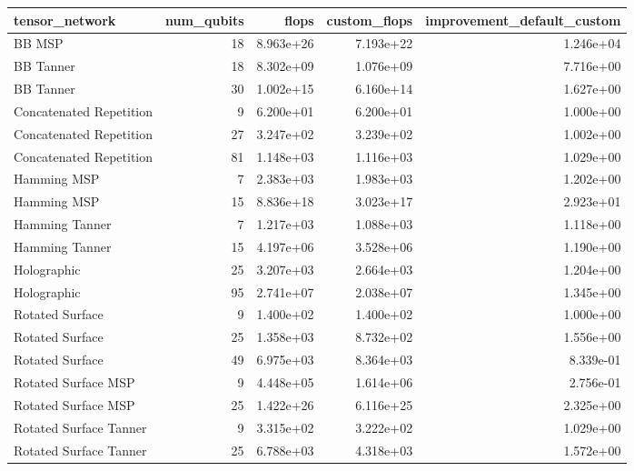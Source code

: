 \begin{tabular}{lrrrr}
\toprule
tensor_network & num_qubits & flops & custom_flops & improvement_default_custom \\
\midrule
BB MSP & 18 & 8.963e+26 & 7.193e+22 & 1.246e+04 \\
BB Tanner & 18 & 8.302e+09 & 1.076e+09 & 7.716e+00 \\
BB Tanner & 30 & 1.002e+15 & 6.160e+14 & 1.627e+00 \\
Concatenated Repetition & 9 & 6.200e+01 & 6.200e+01 & 1.000e+00 \\
Concatenated Repetition & 27 & 3.247e+02 & 3.239e+02 & 1.002e+00 \\
Concatenated Repetition & 81 & 1.148e+03 & 1.116e+03 & 1.029e+00 \\
Hamming MSP & 7 & 2.383e+03 & 1.983e+03 & 1.202e+00 \\
Hamming MSP & 15 & 8.836e+18 & 3.023e+17 & 2.923e+01 \\
Hamming Tanner & 7 & 1.217e+03 & 1.088e+03 & 1.118e+00 \\
Hamming Tanner & 15 & 4.197e+06 & 3.528e+06 & 1.190e+00 \\
Holographic & 25 & 3.207e+03 & 2.664e+03 & 1.204e+00 \\
Holographic & 95 & 2.741e+07 & 2.038e+07 & 1.345e+00 \\
Rotated Surface & 9 & 1.400e+02 & 1.400e+02 & 1.000e+00 \\
Rotated Surface & 25 & 1.358e+03 & 8.732e+02 & 1.556e+00 \\
Rotated Surface & 49 & 6.975e+03 & 8.364e+03 & 8.339e-01 \\
Rotated Surface MSP & 9 & 4.448e+05 & 1.614e+06 & 2.756e-01 \\
Rotated Surface MSP & 25 & 1.422e+26 & 6.116e+25 & 2.325e+00 \\
Rotated Surface Tanner & 9 & 3.315e+02 & 3.222e+02 & 1.029e+00 \\
Rotated Surface Tanner & 25 & 6.788e+03 & 4.318e+03 & 1.572e+00 \\
\bottomrule
\end{tabular}
